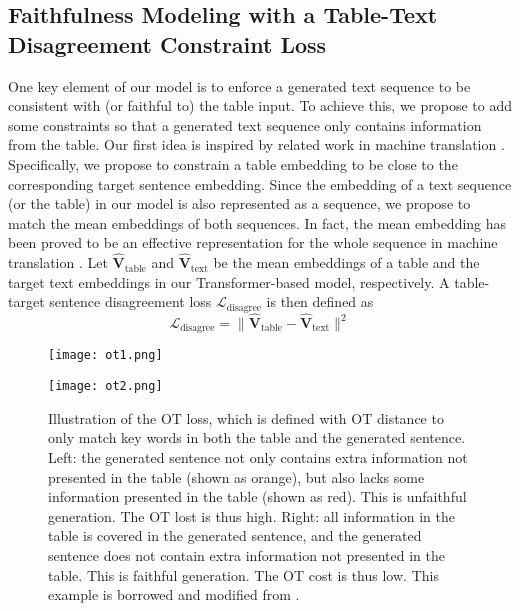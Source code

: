 \documentclass[11pt,a4paper]{article}
\begin{document}
\subsection {Faithfulness Modeling with a Table-Text Disagreement Constraint Loss}

One key element of our model is to enforce a generated text sequence to be consistent with (or faithful to) the table input. To achieve this, we propose to add some constraints so that a generated text sequence only contains information from the table. Our first idea is inspired by related work in machine translation \cite{sentagree2019}. Specifically, we propose to constrain a table embedding to be close to the corresponding target sentence embedding. Since the embedding of a text sequence (or the table) in our model is also represented as a sequence, we propose to match the mean embeddings of both sequences. In fact, the mean embedding has been proved to be an effective representation for the whole sequence in machine translation \cite{sentagree2019, wang2017}. Let $\hat{\bm{V}}_{\text{table}}$ and $\hat{\bm{V}}_{\text{text}}$ be the mean embeddings of a table and the target text embeddings in our Transformer-based model, respectively. A table-target sentence
disagreement loss $\mathcal{L}_{\text{disagree}}$ is then defined as
\begin{equation}
    \mathcal{L}_{\text{disagree}} =  \lVert \hat{\bm{V}}_{\text{table}} - \hat{\bm{V}}_{\text{text}} \rVert ^2
\end{equation}

\begin{figure*}
    \centering
    
    \begin{minipage}{0.49\linewidth}
        \texttt{[image: ot1.png]}
    \end{minipage}
    \begin{minipage}{0.49\linewidth}
        \texttt{[image: ot2.png]}
    \end{minipage}
    
    \caption{Illustration of the OT loss, which is defined with OT distance to only match key words in both the table and the generated sentence. Left: the generated sentence not only contains extra information not presented in the table (shown as orange), but also lacks some information presented in the table (shown as red).  This is unfaithful generation. The OT lost is thus high. Right: all information in the table is covered in the generated sentence, and the generated sentence does not contain extra information not presented in the table. This is faithful generation. The OT cost is thus low. This example is borrowed and modified from \cite{Dhingra2019}.}
    \label{fig:OT_loss}
    \vspace{-0.4cm}
\end{figure*}
\end{document}
